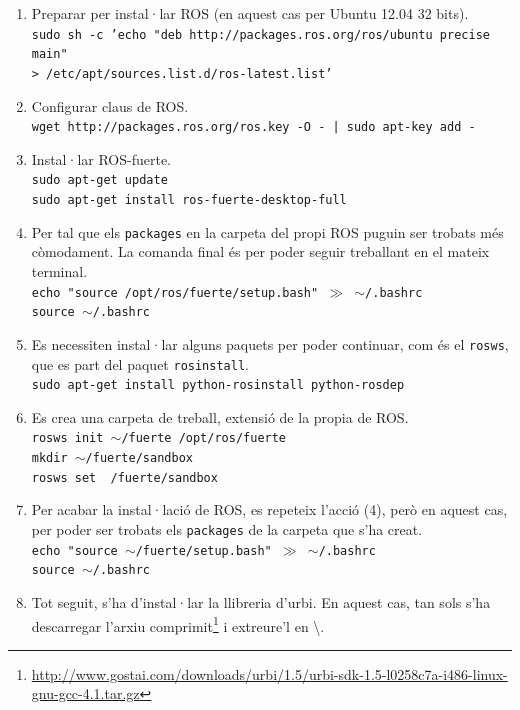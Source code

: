 \documentclass[12pt,a4paper,final,twoside]{article}
\begin{document}
\begin{enumerate}

\item Preparar per instal·lar ROS (en aquest cas per Ubuntu 12.04 32 bits).\\
\texttt{sudo sh -c 'echo "deb http://packages.ros.org/ros/ubuntu precise main" \\ > /etc/apt/sources.list.d/ros-latest.list'}

\item Configurar claus de ROS.\\
\texttt{wget http://packages.ros.org/ros.key -O - | sudo apt-key add -}

\item Instal·lar ROS-fuerte.\\
\texttt{sudo apt-get update}\\
\texttt{sudo apt-get install ros-fuerte-desktop-full}

\item Per tal que els \texttt{packages} en la carpeta del propi ROS puguin ser trobats més còmodament. La comanda final és per poder seguir treballant en el mateix terminal.\\
\texttt{echo "source /opt/ros/fuerte/setup.bash" $\gg$ $\sim$/.bashrc\\
source $\sim$/.bashrc}

\item Es necessiten instal·lar alguns paquets per poder continuar, com és el \texttt{rosws}, que es part del paquet \texttt{rosinstall}.\\
\texttt{sudo apt-get install python-rosinstall python-rosdep}

\item Es crea una carpeta de treball, extensió de la propia de ROS.\\
\texttt{rosws init $\sim$/fuerte /opt/ros/fuerte}\\
\texttt{mkdir $\sim$/fuerte/sandbox}\\
\texttt{rosws set ~/fuerte/sandbox}

\item Per acabar la instal·lació de ROS, es repeteix l'acció (4), però en aquest cas, per poder ser trobats els \texttt{packages} de la carpeta que s'ha creat.\\
\texttt{echo "source $\sim$/fuerte/setup.bash" $\gg$ $\sim$/.bashrc\\
source $\sim$/.bashrc}

\item Tot seguit, s'ha d'instal·lar la llibreria d'urbi. En aquest cas, tan sols s'ha descarregar l'arxiu comprimit\footnote{\url{http://www.gostai.com/downloads/urbi/1.5/urbi-sdk-1.5-l0258c7a-i486-linux-gnu-gcc-4.1.tar.gz}} i extreure'l en \textbackslash .\\


\end{enumerate}
\end{document}
